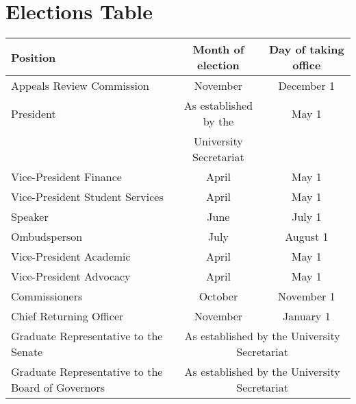 \section{Elections Table}

\begin{center}
    \begin{tabular}{ l |c   c }

    Position & Month of election & Day of taking office \\  \hline
    Appeals Review Commission & November & December 1\\ 
    President & As established by the & May 1\\
     & University Secretariat & \\
    Vice-President Finance  & April & May 1 \\ 
    Vice-President Student Services & April & May 1 \\ 
    Speaker & June & July 1 \\ 
    Ombudsperson & July & August 1\\
    Vice-President Academic & April & May 1 \\ 
    Vice-President Advocacy & April & May 1 \\ 
    Commissioners & October & November  1 \\ 
    Chief Returning Officer & November & January 1 \\ 
    Graduate Representative to the Senate &\multicolumn{2}{c}{As established by the University Secretariat}\\
	Graduate Representative to the Board of Governors  &\multicolumn{2}{c}{As established by the University Secretariat}\\	
\end{tabular}
\end{center}


\newpage
